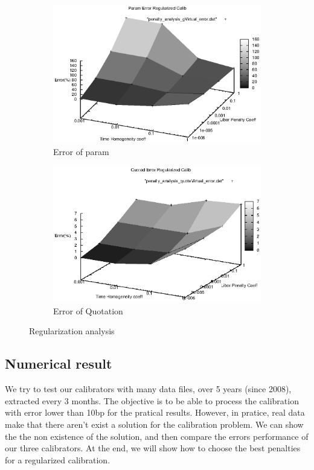 \documentclass[a4paper,10pt]{article}
\begin{document}
\begin{figure}[h]
\begin{subfigure}{.5\textwidth}
  \centering
  \includegraphics[scale=0.5]{penalty_analysis_gVirtual_error}
  \caption{Error of param}
  \label{fig:regularized_param}
\end{subfigure}%
\begin{subfigure}{.5\textwidth}
  \centering
  \includegraphics[scale=0.5]{penalty_analysis_quoteVirtual_error}
  \caption{Error of Quotation}
  \label{fig:regularized_quotation}
\end{subfigure}
\caption{Regularization analysis}
\label{fig:regularization_analysis}
\end{figure}

\subsection{Numerical result}
We try to test our calibrators with many data files, over 5 years (since 2008), extracted every 3 months. The objective is to be able to process the calibration with error lower than 10bp for the pratical results. However, in pratice, real data make that there aren't exist a solution for the calibration problem. We can show the the non existence of the solution, and then compare the errors performance of our three calibrators. At the end, we will show how to choose the best penalties for a regularized calibration.
\end{document}
